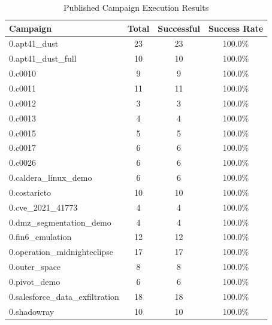 \begin{table}[htbp]
\centering
\caption{Published Campaign Execution Results}
\label{tab:execution}
\begin{tabular}{lccc}
\toprule
Campaign & Total & Successful & Success Rate \\
\midrule
0.apt41_dust & 23 & 23 & 100.0\% \\
0.apt41_dust_full & 10 & 10 & 100.0\% \\
0.c0010 & 9 & 9 & 100.0\% \\
0.c0011 & 11 & 11 & 100.0\% \\
0.c0012 & 3 & 3 & 100.0\% \\
0.c0013 & 4 & 4 & 100.0\% \\
0.c0015 & 5 & 5 & 100.0\% \\
0.c0017 & 6 & 6 & 100.0\% \\
0.c0026 & 6 & 6 & 100.0\% \\
0.caldera_linux_demo & 6 & 6 & 100.0\% \\
0.costaricto & 10 & 10 & 100.0\% \\
0.cve_2021_41773 & 4 & 4 & 100.0\% \\
0.dmz_segmentation_demo & 4 & 4 & 100.0\% \\
0.fin6_emulation & 12 & 12 & 100.0\% \\
0.operation_midnighteclipse & 17 & 17 & 100.0\% \\
0.outer_space & 8 & 8 & 100.0\% \\
0.pivot_demo & 6 & 6 & 100.0\% \\
0.salesforce_data_exfiltration & 18 & 18 & 100.0\% \\
0.shadowray & 10 & 10 & 100.0\% \\
\bottomrule
\end{tabular}
\end{table}
